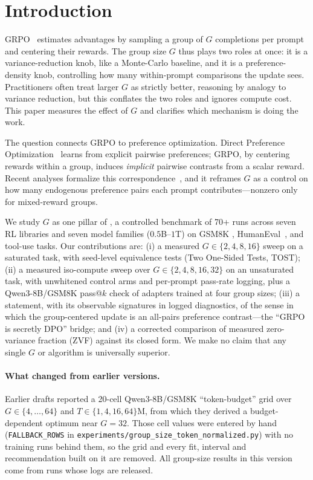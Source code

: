 \section{Introduction}
\label{sec:p3-intro}
GRPO~\citep{guo2025deepseekr1, shao2024deepseekmath} estimates advantages by
sampling a group of $G$ completions per prompt and centering their rewards. The
group size $G$ thus plays two roles at once: it is a variance-reduction knob, like
a Monte-Carlo baseline, and it is a preference-density knob, controlling how many
within-prompt comparisons the update sees. Practitioners often treat larger $G$ as
strictly better, reasoning by analogy to variance reduction, but this conflates the
two roles and ignores compute cost. This paper measures the effect of $G$ and
clarifies which mechanism is doing the work.

The question connects GRPO to preference optimization. Direct Preference
Optimization~\citep{rafailov2024direct} learns from explicit pairwise preferences;
GRPO, by centering rewards within a group, induces \emph{implicit} pairwise
contrasts from a scalar reward. Recent analyses formalize this
correspondence~\citep{wu2025grpodpo}, and it reframes $G$ as a control
on how many endogenous preference pairs each prompt contributes---nonzero only for
mixed-reward groups.

We study $G$ as one pillar of \ours{}, a controlled benchmark of 70+ runs across
seven RL libraries and seven model families ($0.5$B--$1$T) on GSM8K
\citep{cobbe2021training}, HumanEval~\citep{chen2021codex}, and tool-use tasks. Our
contributions are: (i) a measured $G\in\{2,4,8,16\}$ sweep on a saturated task,
with seed-level equivalence tests (Two One-Sided Tests, TOST);
(ii) a measured iso-compute sweep over $G\in\{2,4,8,16,32\}$ on an unsaturated
task, with unwhitened control arms and per-prompt pass-rate logging, plus a
Qwen3-8B/GSM8K pass@$k$ check of adapters trained at four group sizes;
(iii) a statement, with its observable signatures in logged diagnostics, of the
sense in which the group-centered update is an all-pairs preference
contrast---the ``GRPO is secretly DPO'' bridge; and (iv) a corrected comparison of
measured zero-variance fraction (ZVF) against its closed form. We make no claim
that any single $G$ or algorithm is universally superior.

\paragraph{What changed from earlier versions.}
Earlier drafts reported a 20-cell Qwen3-8B/GSM8K ``token-budget'' grid over
$G\in\{4,\dots,64\}$ and $T\in\{1,4,16,64\}$M, from which they derived a
budget-dependent optimum near $G{=}32$. Those cell values were entered by hand
(\texttt{FALLBACK\_ROWS} in \texttt{experiments/group\_size\_token\_normalized.py})
with no training runs behind them, so the grid and every fit, interval and
recommendation built on it are removed. All group-size results in this version
come from runs whose logs are released.

